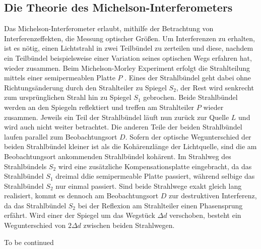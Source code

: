 \subsection{Die Theorie des Michelson-Interferometers}

Das Michelson-Interferometer erlaubt, mithilfe der Betrachtung von Interferenzeffekten, die Messung optischer Größen.
Um Interferenzen zu erhalten, ist es nötig, einen Lichtstrahl in zwei Teilbündel zu zerteilen und diese, nachdem ein Teilbündel beispielsweise einer Variation seines optischen Wegs erfahren hat, wieder zusammen.
Beim Michelson-Morley Experiment erfolgt die Strahlteilung mittels einer semipermeablen Platte $P$ .
Eines der Strahlbündel geht dabei ohne Richtungsänderung durch den Strahlteiler zu Spiegel $S_2$, der Rest wird senkrecht zum ursprünglichen Strahl hin zu Spiegel $S_1$ gebrochen.
Beide Strahlbündel werden an den Spiegeln reflektiert und treffen am Strahlteiler $P$ wieder zusammen. Jeweils ein Teil der Strahlbündel läuft nun zurück zur Quelle $L$ und wird auch nicht weiter betrachtet. Die anderen Teile der beiden Strahlbündel laufen parallel zum Beobachtungsort $D$.
Sofern der optische Wegunterschied der beiden Strahlbündel kleiner ist als die Kohärenzlänge der Lichtquelle, sind die am Beobachtungsort ankommenden Strahlbündel kohärent.
Im Strahlweg des Strahlbündels $S_2$ wird eine zusätzliche Kompensationsplatte eingebracht, da das Strahlbündel $S_1$ dreimal ddie semipermeable Platte passiert, während selbige das Strahlbündel $S_2$ nur einmal passiert.
Sind beide Strahlwege exakt gleich lang realisiert, kommt es dennoch am Beobachtungsort $D$ zur destruktiven Interferenz, da das Strahlbündel $S_2$ bei der Reflexion am Strahlteiler einen Phasensprung erfährt.
Wird einer der Spiegel um das Wegstück $\Delta d$ verschoben, besteht ein Wegunterschied von $2\Delta d$ zwischen beiden Strahlwegen.

To be continued







\cite{Anleitung}
